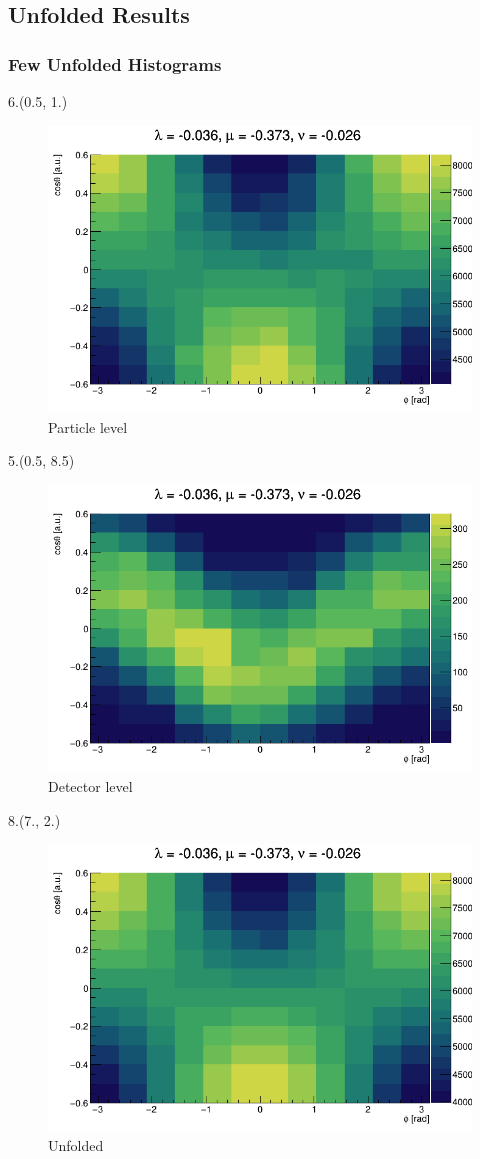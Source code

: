 \documentclass[12pt, xcolor={dvipsnames}, aspectratio = 169, sans, mathserif]{beamer}
\newenvironment{Pic}[2]
{\begin{textblock}{#1}#2
\begin{figure}}
{\end{figure}
\end{textblock}}
\begin{document}
\subsection{Unfolded Results}

\begin{frame}
\frametitle{Few Unfolded Histograms}

\begin{Pic}{6.}{(0.5, 1.)}
  \caption{Particle level}
  \includegraphics[width=6.cm]{imgs/true_fit_1.png}
\end{Pic}

\begin{Pic}{5.}{(0.5, 8.5)}
  \caption{Detector level}
  \includegraphics[width=5.cm]{imgs/reco_fit_1.png}
\end{Pic}

\begin{Pic}{8.}{(7., 2.)}
  \caption{Unfolded}
  \includegraphics[width=8.cm]{imgs/pred_fit_1.png}
\end{Pic}
\end{frame}
\end{document}
